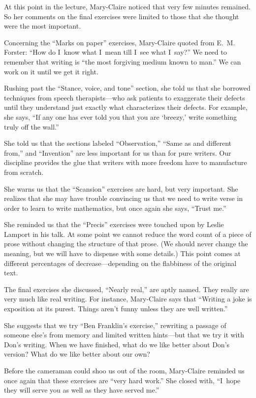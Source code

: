At this point in the lecture, Mary-Claire noticed that very few
minutes remained. So her comments on the final exercises were limited to
 those that she thought were the most important.

Concerning the ``Marks on paper'' exercises, Mary-Claire quoted from 
E.~M. Forster: ``How do I~know what I~mean  till I~see what I~say?''  We need to
remember that writing is ``the most forgiving medium known to man.'' We can
work on it until we get it right.

 Rushing past the ``Stance, voice, and tone'' section, she told us that
she borrowed techniques from speech therapists---who ask patients to
exaggerate their defects until they understand just exactly what
characterizes their defects.  For example, she says, ``If any one has ever
told you that you are `breezy,' write something truly off the wall.''

She told us that the sections labeled ``Observation,'' ``Same as and different
from,'' and ``Invention'' are less important for us than for pure writers.
Our discipline provides the glue that writers with more freedom have to
manufacture from scratch.

She warns us that the ``Scansion'' exercises are hard, but very important.
She realizes that she may have trouble convincing us that we need to write
verse in order to learn to write mathematics, but once again she says,
``Trust me.''

She reminded us that the ``Precis'' exercises were touched upon by Leslie
Lamport in his talk.  At some point we cannot reduce the word count of a
piece of prose without changing the structure of that prose. (We should
never change the meaning, but we will have to dispense with some details.)
This point comes at different percentages of decrease---depending on the
flabbiness of the original text.

The final exercises she discussed, ``Nearly real,'' are aptly named.
They really are very much like real writing.  For instance, Mary-Claire
says that  ``Writing a joke is exposition at its purest.  Things aren't
funny unless they are well written.''

She suggests that we try ``Ben Franklin's exercise,'' rewriting a passage of
someone else's from memory and limited written hints---but that we try it
with Don's writing. When we have finished, what do we like better about
Don's version?  What do we like better about our own?

Before the cameraman could shoo us out of the room, Mary-Claire reminded
us once again that these exercises are ``very hard work.''  She closed with,
``I~hope they will serve you as well as they have served me.''

